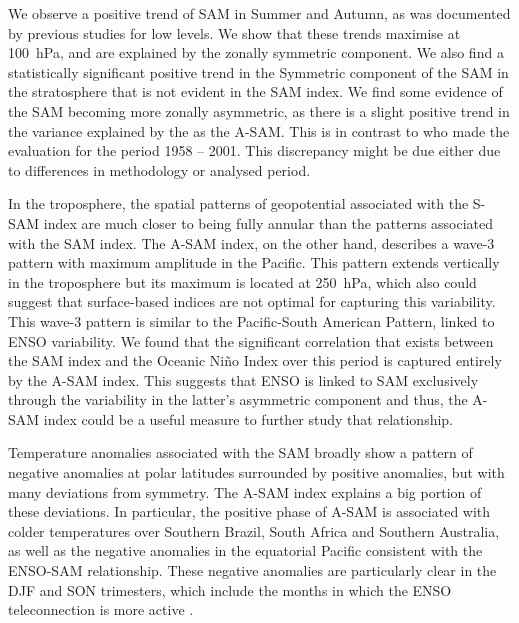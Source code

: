 \documentclass[smallextended]{svjour3}       %
\begin{document}
We observe a positive trend of SAM in Summer and Autumn, as was documented by previous studies \citep[e.g.][ and references therein]{fogt2020} for low levels. We show that these trends maximise at 100~hPa, and are explained by the zonally symmetric component. We also find a statistically significant positive trend in the Symmetric component of the SAM in the stratosphere that is not evident in the SAM index. We find some evidence of the SAM becoming more zonally asymmetric, as there is a slight positive trend in the variance explained by the as the A\nobreakdash-SAM. This is in contrast to \citet{fogt2012} who made the evaluation for the period 1958 -- 2001. This discrepancy might be due either due to differences in methodology or analysed period.

In the troposphere, the spatial patterns of geopotential associated with the S\nobreakdash-SAM index are much closer to being fully annular than the patterns associated with the SAM index. The A\nobreakdash-SAM index, on the other hand, describes a wave-3 pattern with maximum amplitude in the Pacific. This pattern extends vertically in the troposphere but its maximum is located at 250~hPa, which also could suggest that surface-based indices are not optimal for capturing this variability. This wave-3 pattern is similar to the Pacific-South American Pattern, linked to ENSO variability. We found that the significant correlation that exists between the SAM index and the Oceanic Niño Index over this period is captured entirely by the A\nobreakdash-SAM index. This suggests that ENSO is linked to SAM exclusively through the variability in the latter's asymmetric component and thus, the A\nobreakdash-SAM index could be a useful measure to further study that relationship.

Temperature anomalies associated with the SAM broadly show a pattern of negative anomalies at polar latitudes surrounded by positive anomalies, but with many deviations from symmetry. The A\nobreakdash-SAM index explains a big portion of these deviations. In particular, the positive phase of A\nobreakdash-SAM is associated with colder temperatures over Southern Brazil, South Africa and Southern Australia, as well as the negative anomalies in the equatorial Pacific consistent with the ENSO\nobreakdash-SAM relationship. These negative anomalies are particularly clear in the DJF and SON trimesters, which include the months in which the ENSO teleconnection is more active \citep[e.g.][]{cai2020a}.
\end{document}
